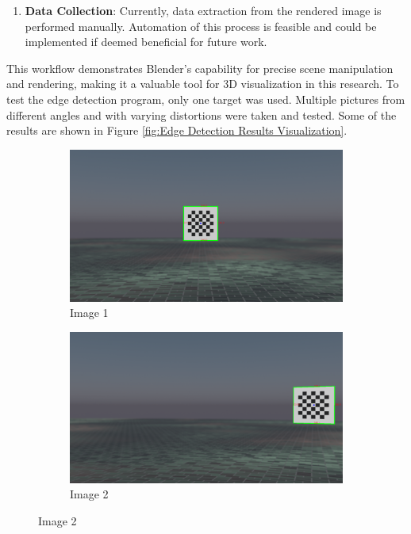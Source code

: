 \begin{enumerate}
    \item \textbf{Data Collection}: Currently, data extraction from the rendered image is performed manually. Automation of this process is feasible and could be implemented if deemed beneficial for future work.
\end{enumerate}

\noindent This workflow demonstrates Blender’s capability for precise scene manipulation and rendering, making it a valuable tool for 3D visualization in this research.
To test the edge detection program, only one target was used. Multiple pictures from different angles and with varying distortions were taken and tested. Some of the results are shown in Figure \ref{fig:Edge Detection Results Visualization}.

\begin{figure}[h!]
    \centering
    \begin{subfigure}[b]{0.45\textwidth}
        \centering
        \includegraphics[width=\textwidth]{Images/02stateart/edge_detection_1.png}
        \caption{Image 1}
    \end{subfigure}
    \hfill
    \begin{subfigure}[b]{0.45\textwidth}
        \centering
        \includegraphics[width=\textwidth]{Images/02stateart/edge_detection_2.png}
        \caption{Image 2}
    \end{subfigure}
    

\end{figure}
